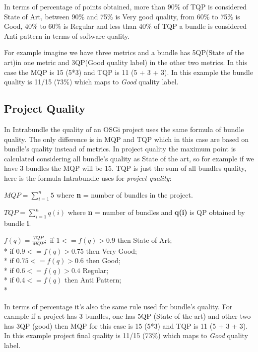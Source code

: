 In terms of percentage of points obtained, more than 90\% of TQP is considered State of Art, between 90\% and 75\% is Very good quality, from 60\% to 75\% is Good, 40\% to 60\% is Regular and less than 40\% of TQP a bundle is considered Anti pattern in terms of software quality. 

For example imagine we have three metrics and a bundle has 5QP(State of the art)in one metric and 3QP(Good quality label) in the other two metrics. In this case the MQP is 15 (5*3) and TQP is 11 (5 + 3 + 3). In this example the bundle quality is 11/15 (73\%) which maps to \emph{Good} quality label. 


\subsection{Project Quality}
\label{sec:project-quality}
In Intrabundle the quality of an OSGi project uses the same formula of bundle quality. The only difference is in MQP and TQP which in this case are based on bundle's quality instead of metrics. In project quality the maximum point is calculated considering all bundle's quality as State of the art, so for example if we have 3 bundles the MQP will be 15. TQP is just the sum of all bundles quality, here is the formula Intrabundle uses for \emph{project quality}:

\(MQP = \sum_{i=1}^{n} 5 \) where \textbf{n} = number of bundles in the project. \newline

\(TQP = \sum_{i=1}^{n} q(i) \) where \textbf{n} = number of bundles and \textbf{q(i)} is QP obtained by bundle \textbf{i}. \newline

 
\(
f(q) = \frac{TQP}{MQP};
\)
\newline
\newline
 if \( 1 <= f(q) > 0.9 \) then State of Art; \\*
 if \( 0.9 <= f(q) > 0.75 \) then Very Good; \\*
 if \( 0.75 <= f(q) > 0.6 \) then Good; \\*
 if \( 0.6 <= f(q) > 0.4 \) Regular; \\*
 if \( 0.4 <= f(q) \) then Anti Pattern;\\*

In terms of percentage it's also the same rule used for bundle's quality. For example if a project has 3 bundles, one has 5QP (State of the art) and other two has 3QP (good) then MQP for this case is 15 (5*3) and TQP is 11 (5 + 3 + 3). In this example project final quality is 11/15 (73\%) which maps to \emph{Good} quality label. 

